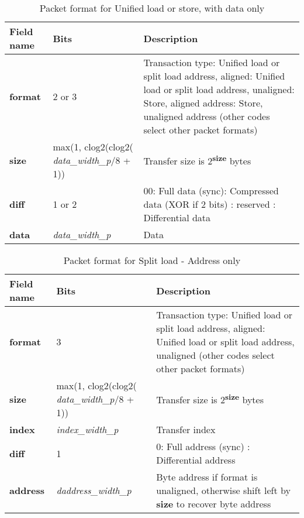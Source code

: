 \begin{table}[htp]
  \centering
  \caption{Packet format for Unified load or store, with data only}
  \label{tab:te_datadx0y2}
  \begin{tabulary}{\textwidth}{|l|p{38mm}|p{92mm}|}
    \hline
    {\bf Field name} & {\bf Bits} & {\bf Description} \\
    \hline
    \textbf{format} & 	2 or 3	& Transaction type: Unified load or split load address, aligned: Unified load or split load address, unaligned: Store, aligned address: Store, unaligned address\newline
		(other codes select other packet formats)\\
    \hline
    \textbf{size} & max(1, clog2(clog2( \textit{data\_width\_p}/8 + 1)) & Transfer size is 2\textsuperscript{\textbf{size}} bytes \\
    \hline
    \textbf{diff} & 1 or 2 & 00: Full data (sync): Compressed data (XOR if 2 bits) : reserved : Differential data\\
    \hline
    \textbf{data} & \textit{data\_width\_p} & 
                Data\\
    \hline
  \end{tabulary}
\end{table}


\begin{table}[htp]
  \centering
  \caption{Packet format for Split load - Address only}
  \label{tab:te_datadx0y3}
  \begin{tabulary}{\textwidth}{|l|p{38mm}|p{92mm}|}
    \hline
    {\bf Field name} & {\bf Bits} & {\bf Description} \\
    \hline
    \textbf{format} & 	3	& Transaction type: Unified load or split load address, aligned: Unified load or split load address, unaligned\newline
		(other codes select other packet formats)\\
    \hline
    \textbf{size} & max(1, clog2(clog2( \textit{data\_width\_p}/8 + 1)) & Transfer size is 2\textsuperscript{\textbf{size}} bytes \\
    \hline
    \textbf{index} & \textit{index\_width\_p} & Transfer index\\
    \hline
    \textbf{diff} & 1 & 0: Full address (sync)	: Differential address\\
    \hline
    \textbf{address} &  \textit{daddress\_width\_p} & Byte address if format is unaligned, otherwise shift left by \textbf{size} to recover byte address \\
    \hline
  \end{tabulary}
\end{table}

